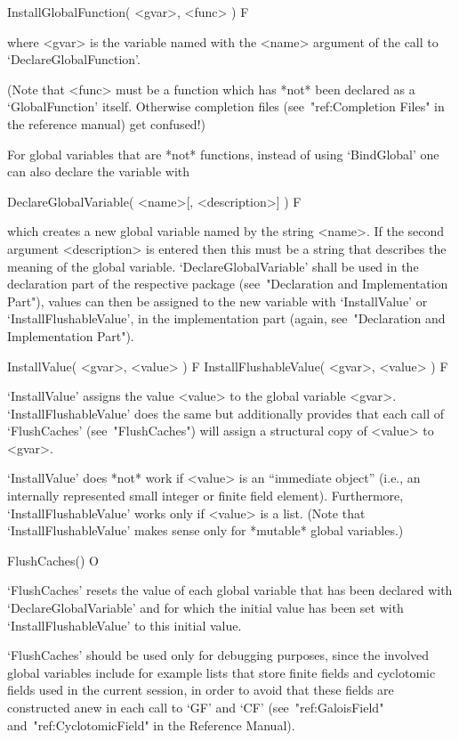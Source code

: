 \>InstallGlobalFunction( <gvar>, <func> ) F

where <gvar> is the variable named with the <name> argument of the call
to `DeclareGlobalFunction'.

(Note that <func> must be a function which has *not* been declared as a
`GlobalFunction' itself. Otherwise completion files
(see~"ref:Completion Files" in the reference manual) get confused!)

For global variables that are *not* functions,
instead of using `BindGlobal' one can also declare the variable with

\>DeclareGlobalVariable( <name>[, <description>] ) F

which creates a new global variable named by the string <name>.
If the second argument <description> is entered then this must be
a string that describes the meaning of the global variable.
`DeclareGlobalVariable' shall be used in the declaration part of the
respective package (see~"Declaration and Implementation Part"),
values can then be assigned to the new variable with `InstallValue' or
`InstallFlushableValue', in the implementation part
(again, see~"Declaration and Implementation Part").

\>InstallValue( <gvar>, <value> ) F
\>InstallFlushableValue( <gvar>, <value> ) F

`InstallValue' assigns the value <value> to the global variable <gvar>.
`InstallFlushableValue' does the same but additionally provides that
each call of `FlushCaches' (see~"FlushCaches")
will assign a structural copy of <value> to <gvar>.

`InstallValue' does *not* work if <value> is an ``immediate object''
(i.e., an internally represented small integer or finite field element).
Furthermore, `InstallFlushableValue' works only if <value> is a list.
(Note that `InstallFlushableValue' makes sense only for *mutable*
global variables.)

\>FlushCaches() O

`FlushCaches' resets the value of each global variable that has
been declared with `DeclareGlobalVariable' and for which the initial
value has been set with `InstallFlushableValue' to this initial value.

`FlushCaches' should be used only for debugging purposes,
since the involved global variables include for example lists that store
finite fields and cyclotomic fields used in the current {\GAP} session,
in order to avoid that these fields are constructed anew in each call
to `GF' and `CF' (see~"ref:GaloisField" and~"ref:CyclotomicField"
in the Reference Manual).


